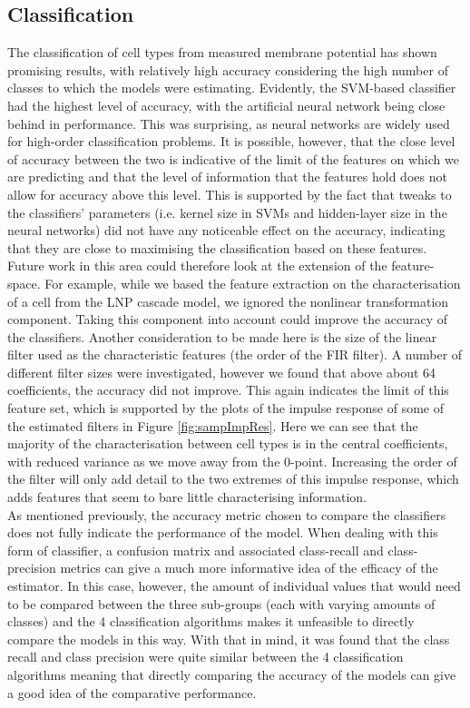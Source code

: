 \documentclass[letterpaper, 10 pt, conference]{ieeeconf}  %
\begin{document}
\subsection*{Classification}
The classification of cell types from measured membrane potential has shown promising results, with relatively high accuracy considering the high number of classes to which the models were estimating. Evidently, the SVM-based classifier had the highest level of accuracy, with the artificial neural network being close behind in performance. This was surprising, as neural networks are widely used for high-order classification problems. It is possible, however, that the close level of accuracy between the two is indicative of the limit of the features on which we are predicting and that the level of information that the features hold does not allow for accuracy above this level. This is supported by the fact that tweaks to the classifiers' parameters (i.e. kernel size in SVMs and hidden-layer size in the neural networks) did not have any noticeable effect on the accuracy, indicating that they are close to maximising the classification based on these features. Future work in this area could therefore look at the extension of the feature-space. For example, while we based the feature extraction on the characterisation of a cell from the LNP cascade model, we ignored the nonlinear transformation component. Taking this component into account could improve the accuracy of the classifiers. Another consideration to be made here is the size of the linear filter used as the characteristic features (the order of the FIR filter). A number of different filter sizes were investigated, however we found that above about 64 coefficients, the accuracy did not improve. This again indicates the limit of this feature set, which is supported by the plots of the impulse response of some of the estimated filters in Figure \ref{fig:sampImpRes}. Here we can see that the majority of the characterisation between cell types is in the central coefficients, with reduced variance as we move away from the 0-point. Increasing the order of the filter will only add detail to the two extremes of this impulse response, which adds features that seem to bare little characterising information.\\
As mentioned previously, the accuracy metric chosen to compare the classifiers does not fully indicate the performance of the model. When dealing with this form of classifier, a confusion matrix and associated class-recall and class-precision metrics can give a much more informative idea of the efficacy of the estimator. In this case, however, the amount of individual values that would need to be compared between the three sub-groups (each with varying amounts of classes) and the 4 classification algorithms makes it unfeasible to directly compare the models in this way. With that in mind, it was found that the class recall and class precision were quite similar between the 4 classification algorithms meaning that directly comparing the accuracy of the models can give a good idea of the comparative performance.\\
\end{document}
